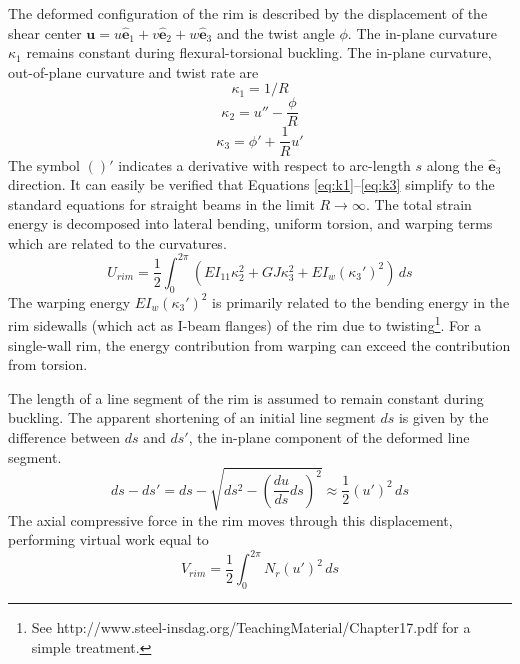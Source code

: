 \documentclass{bmd2016p}
\newcommand{\e}{\ensuremath{\hat{\bm{e}}_1}}
\newcommand{\ee}{\ensuremath{\hat{\bm{e}}_2}}
\newcommand{\eee}{\ensuremath{\hat{\bm{e}}_3}}
\begin{document}
The deformed configuration of the rim is described by the displacement of the shear center $\bm{u}=u\e + v\ee + w\eee$ and the twist angle $\phi$. The in-plane curvature $\kappa_1$ remains constant during flexural-torsional buckling. The in-plane curvature, out-of-plane curvature and twist rate are
	\begin{equation}\label{eq:k1}
	\kappa_1 = 1/R
	\end{equation}
	\begin{equation}\label{eq:k2}
	\kappa_2 = u'' - \frac{\phi}{R}
	\end{equation}
	\begin{equation}\label{eq:k3}
	\kappa_3 = \phi' + \frac{1}{R} u'
	\end{equation}
The symbol $()'$ indicates a derivative with respect to arc-length $s$ along the \eee{} direction. It can easily be verified that Equations \ref{eq:k1}--\ref{eq:k3} simplify to the standard equations for straight beams in the limit $R\rightarrow \infty$. The total strain energy is decomposed into lateral bending, uniform torsion, and warping terms which are related to the curvatures.
	\begin{equation}\label{eq:Urim}
	U_{rim} = \frac{1}{2} \int_0^{2\pi} \left( EI_{11} \kappa_2^2 + GJ \kappa_3^2 + EI_w (\kappa_3')^2 \right)\, ds
	\end{equation}
The warping energy $EI_w(\kappa_3')^2$ is primarily related to the bending energy in the rim sidewalls (which act as I-beam flanges) of the rim due to twisting\footnote{See http://www.steel-insdag.org/TeachingMaterial/Chapter17.pdf for a simple treatment.}. For a single-wall rim, the energy contribution from warping can exceed the contribution from torsion.

The length of a line segment of the rim is assumed to remain constant during buckling. The apparent shortening of an initial line segment $ds$ is given by the difference between $ds$ and $ds'$, the in-plane component of the deformed line segment.
	\begin{equation}\label{eq:ds}
	ds - ds' = ds - \sqrt{ds^2 - \left(\frac{du}{ds}ds\right)^2} \approx \frac{1}{2} (u')^2 \, ds
	\end{equation}
The axial compressive force in the rim moves through this displacement, performing virtual work equal to
	\begin{equation}\label{eq:Vrim}
	V_{rim} = \frac{1}{2} \int_0^{2\pi} N_r (u')^2 \, ds
	\end{equation}
\end{document}
